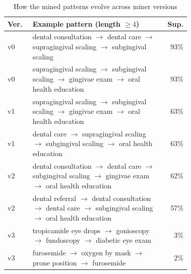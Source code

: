 \begin{table}[t]

\caption{How the mined patterns evolve across miner versions}

\label{tab:ablation}

\centering

\scriptsize

\begin{tabular}{@{}l p{0.72\linewidth} r@{}}

\toprule

Ver. & Example pattern (length $\ge 4$) & Sup. \\

\midrule

v0 & dental consultation $\rightarrow$ dental care $\rightarrow$ supragingival scaling $\rightarrow$ subgingival scaling & 93\% \\

v0 & supragingival scaling $\rightarrow$ subgingival scaling $\rightarrow$ gingivae exam $\rightarrow$ oral health education & 93\% \\

\addlinespace

v1 & supragingival scaling $\rightarrow$ subgingival scaling $\rightarrow$ gingivae exam $\rightarrow$ oral health education & 63\% \\

v1 & dental care $\rightarrow$ supragingival scaling $\rightarrow$ subgingival scaling $\rightarrow$ oral health education & 63\% \\

\addlinespace

v2 & dental consultation $\rightarrow$ dental care $\rightarrow$ subgingival scaling $\rightarrow$ gingivae exam $\rightarrow$ oral health education & 62\% \\

v2 & dental referral $\rightarrow$ dental consultation $\rightarrow$ dental care $\rightarrow$ subgingival scaling $\rightarrow$ oral health education & 57\% \\

\midrule

v3 & tropicamide eye drops $\rightarrow$ gonioscopy $\rightarrow$ fundoscopy $\rightarrow$ diabetic eye exam & 3\% \\

v3 & furosemide $\rightarrow$ oxygen by mask $\rightarrow$ prone position $\rightarrow$ furosemide & 2\% \\


\end{tabular}
\end{table}
